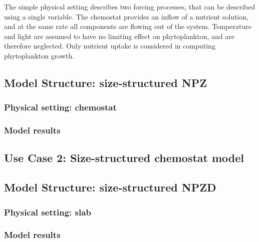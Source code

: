 \documentclass[journal abbreviation, manuscript]{copernicus}
\begin{document}
The simple physical setting describes two forcing processes, that can be described using a single variable. The chemostat provides an inflow of a nutrient solution, and at the same rate all components are flowing out of the system.
Temperature and light are assumed to have no limiting effect on phytoplankton, and are therefore neglected. Only nutrient uptake is considered in computing phytoplankton growth.





\subsection{Model Structure: size-structured NPZ}

\subsubsection{Physical setting: chemostat}


\subsubsection{Model results}


\subsection{Use Case 2: Size-structured chemostat model}

\subsection{Model Structure: size-structured NPZD}


\subsubsection{Physical setting: slab}

\subsubsection{Model results}


\clearpage
\end{document}
